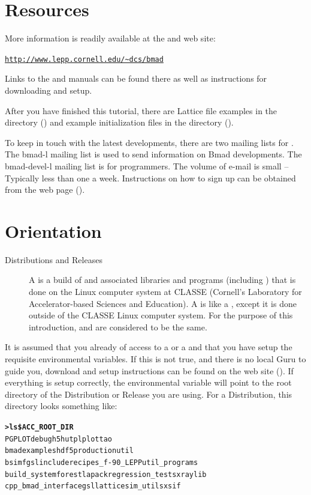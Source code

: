 \documentclass{hitec}
\newcommand{\BF}[1]{{\normalfont\textbf{#1}}}
\newcommand{\Section}[1]{\section{#1}\vspace*{-1ex}}
\newenvironment{display}
  {\vspace*{-1.5ex} \begin{alltt}}
  {\end{alltt} \vspace*{-1.0ex}}
\begin{document}
\Section{Resources}
\label{s:resources}

More information is readily available at the \bmad and \tao web site:
\begin{display}
  \url{http://www.lepp.cornell.edu/~dcs/bmad}
\end{display}
Links to the \bmad and \tao manuals can be found there as well as instructions for
downloading and setup.

After you have finished this tutorial, there are Lattice file examples in the 
directory () and example \tao initialization files in the 
directory ().

To keep in touch with the latest \bmad developments, there are two mailing lists for
\bmad.  The bmad-l mailing list is used to send information on Bmad developments.  The
bmad-devel-l mailing list is for programmers. The volume of e-mail is small -- Typically
less than one a week. Instructions on how to sign up can be obtained from the \bmad web
page ().

\Section{Orientation}
\label{s:orientation}

  \begin{description}
  \item[Distributions and Releases] \Newline
A  is a build of \bmad and associated libraries and programs (including \tao)
that is done on the Linux computer system at CLASSE (Cornell's Laboratory for
Accelerator-based Sciences and Education). A  is like a ,
except it is done outside of the CLASSE Linux computer system. For the purpose
of this introduction,  and  are considered to be the same.
  \end{description}

It is assumed that you already of access to a  or a  and that
you have setup the requisite environmental variables. If this is not true, and there is no
local \bmad Guru to guide you, download and setup instructions can be found on the \bmad web
site (). If everything is setup correctly, the environmental variable
 will point to the root directory of the Distribution or Release you are
using. For a Distribution, this directory looks something like:
\begin{display}
  \BF{> ls \$ACC_ROOT_DIR}
  PGPLOT                debug       h5hut        plplot                tao
  bmad                  examples    hdf5         production            util
  bsim                  fgsl        include      recipes_f-90_LEPP     util_programs
  build_system          forest      lapack       regression_tests      xraylib
  cpp_bmad_interface    gsl         lattice      sim_utils             xsif
\end{display}
\end{document}

